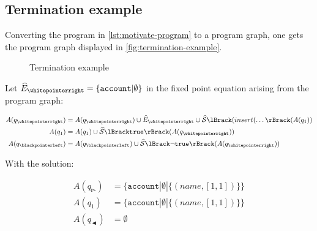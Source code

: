 \subsection{Termination example}\label{subsec:termination-example}

Converting the program in \autoref{lst:motivate-program} to a program graph, one gets the program graph displayed in \autoref{fig:termination-example}.

\begin{figure}
    \centering
    
    \caption{Termination example}
    \label{fig:termination-example}
\end{figure}

Let $\ab{E}_\whitepointerright = \{ \texttt{account} | \emptyset \}$ in the fixed point equation arising from the program graph:

\begin{align}
    A(q_\whitepointerright) &= A(q_\whitepointerright) \cup \ab{E}_\whitepointerright \cup \abssem{(insert(\dots}(A(q_1)) \\
    A(q_1) &= A(q_1) \cup \abssem{\texttt{true}}(A(q_\whitepointerright)) \\
    A(q_\blackpointerleft) &= A(q_\blackpointerleft) \cup \abssem{\neg\texttt{true}}(A(q_\whitepointerright))
\end{align}

With the solution:

\begin{align}
    A(q_\whitepointerright) &= \{ \texttt{account} | \emptyset | \{(name, [1, 1])\}\} \\
    A(q_1) &= \{ \texttt{account} | \emptyset | \{(name, [1, 1])\}\} \\
    A(q_\blackpointerleft) &= \emptyset
\end{align}
